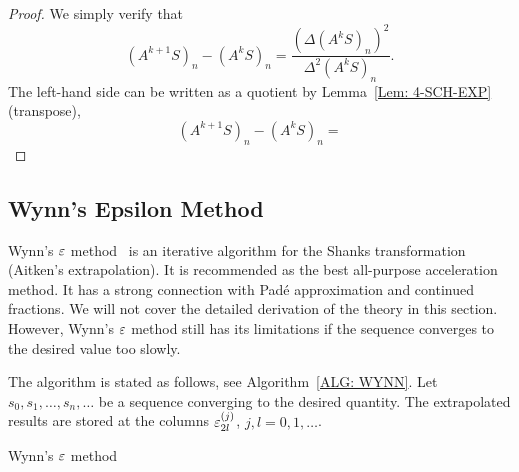 \begin{proof}
    We simply verify that 
    \begin{equation}
          (A^{k+1} S)_n - (A^{k} S)_n = \frac{(\Delta  (A^{k} S)_n)^2 }{\Delta^2  (A^{k} S)_n }.
    \end{equation}
    The left-hand side can be written as a quotient by Lemma~\ref{Lem: 4-SCH-EXP} (transpose),
    \begin{equation}
    (A^{k+1} S)_n - (A^{k} S)_n = 
    \end{equation}
\end{proof}
\subsection{Wynn's Epsilon Method}
\label{SSec: 3-Wynn-Eps-Met}
Wynn's $\varepsilon$ method~\cite{wynn1956device,wynn1966convergence} is an iterative algorithm for the Shanks transformation (Aitken's extrapolation). It is recommended as the best all-purpose acceleration method. It has a strong connection with Pad\'e approximation and continued fractions. We will not cover the detailed derivation of the theory in this section. However, Wynn's $\varepsilon$ method still has its limitations if the sequence converges to the desired value too slowly. 

The algorithm is stated as follows, see Algorithm~\ref{ALG: WYNN}. Let $s_0, s_1, \dots, s_n,\dots$ be a sequence converging to the desired quantity. The extrapolated results are stored at the columns $\varepsilon_{2l}^{(j)}$, $j, l=0,1, \dots$.
\begin{algorithm}[!htb]
    \SetAlgoLined
    \caption{Wynn's $\varepsilon$ method}
    \label{ALG: WYNN}
\end{algorithm}

